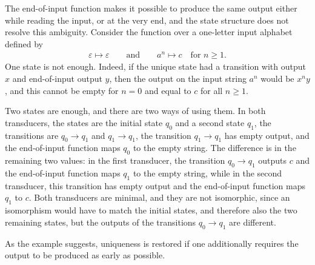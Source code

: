  {
    The end-of-input function makes it possible to produce the same output either while reading the input, or at the very end, and the state structure does not resolve this ambiguity. Consider the function over a one-letter input alphabet defined by
    \begin{align*}
    \varepsilon \mapsto \varepsilon \qquad \text{and} \qquad a^n \mapsto c \quad \text{for $n \geq 1$}.
    \end{align*}
    One state is not enough. Indeed, if the unique state had a transition with output $x$ and end-of-input output $y$, then the output on the input string $a^n$ would be $x^n y$, and this cannot be empty for $n=0$ and equal to $c$ for all $n \geq 1$.

    Two states are enough, and there are two ways of using them. In both transducers, the states are the initial state $q_0$ and a second state $q_1$, the transitions are $q_0 \to q_1$ and $q_1 \to q_1$, the transition $q_1 \to q_1$ has empty output, and the end-of-input function maps $q_0$ to the empty string. The difference is in the remaining two values: in the first transducer, the transition $q_0 \to q_1$ outputs $c$ and the end-of-input function maps $q_1$ to the empty string, while in the second transducer, this transition has empty output and the end-of-input function maps $q_1$ to $c$. Both transducers are minimal, and they are not isomorphic, since an isomorphism would have to match the initial states, and therefore also the two remaining states, but the outputs of the transitions $q_0 \to q_1$ are different.

    As the example suggests, uniqueness is restored if one additionally requires the output to be produced as early as possible.
}

